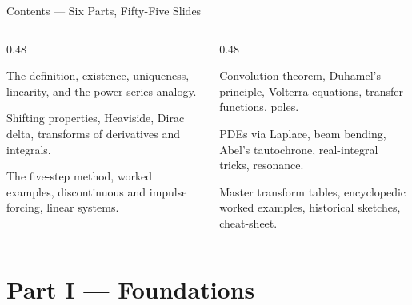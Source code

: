 \documentclass[aspectratio=169,11pt]{beamer}
\begin{document}
\begin{frame}{Contents --- Six Parts, Fifty-Five Slides}
\footnotesize
\begin{columns}[T]
\begin{column}{0.48\textwidth}
\begin{topicsbox}
The definition, existence, uniqueness, linearity, and the power-series analogy.
\end{topicsbox}
\vspace{1mm}
\begin{topicsbox}
Shifting properties, Heaviside, Dirac delta, transforms of derivatives and integrals.
\end{topicsbox}
\vspace{1mm}
\begin{topicsbox}
The five-step method, worked examples, discontinuous and impulse forcing, linear systems.
\end{topicsbox}
\end{column}
\begin{column}{0.48\textwidth}
\begin{topicsbox}
Convolution theorem, Duhamel's principle, Volterra equations, transfer functions, poles.
\end{topicsbox}
\vspace{1mm}
\begin{topicsbox}
PDEs via Laplace, beam bending, Abel's tautochrone, real-integral tricks, resonance.
\end{topicsbox}
\vspace{1mm}
\begin{topicsbox}
Master transform tables, encyclopedic worked examples, historical sketches, cheat-sheet.
\end{topicsbox}
\end{column}
\end{columns}
\end{frame}


\section{Part I --- Foundations}
\end{document}
